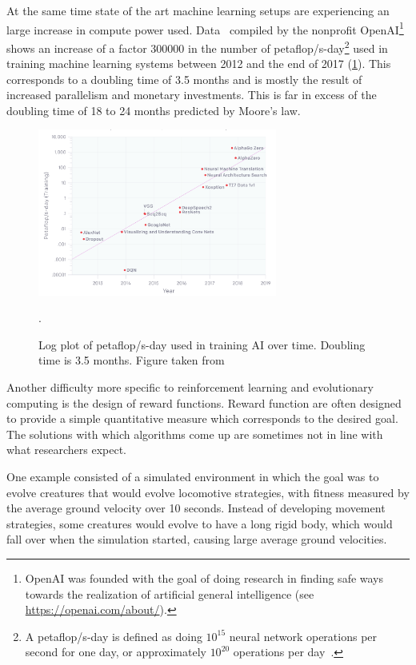 \documentclass[11pt, a4paper]{report} %
\begin{document}
At the same time state of the art machine learning setups are experiencing an large increase in compute power used.
Data~\cite{amodei2018} compiled by the nonprofit OpenAI\footnote{OpenAI was founded with the goal of doing research in finding safe ways towards the realization of artificial general intelligence (see \href{https://openai.com/about/}{https://openai.com/about/}).} shows an increase of a factor 300000 in the number of petaflop/s-day\footnote{A petaflop/s-day is defined as doing $10^{15}$ neural network operations per second for one day, or approximately $10^{20}$ operations per day~\cite{amodei2018}.} used in training machine learning systems between 2012 and the end of 2017 (\cref{fig:increasedaiflops}). 
This corresponds to a doubling time of 3.5 months and is mostly the result of increased parallelism and monetary investments.
This is far in excess of the doubling time of 18 to 24 months predicted by Moore's law.

\begin{figure}[tb!]
  \centering
  \includegraphics[width=0.7\textwidth]{increaseaiflops.png}
  \caption{Log plot of petaflop/s-day used in training AI over time. Doubling time is 3.5 months. Figure taken from~\cite{amodei2018}}.
  \label{fig:increasedaiflops}
\end{figure}

Another difficulty more specific to reinforcement learning and evolutionary computing is the design of reward functions.
Reward function are often designed to provide a simple quantitative measure which corresponds to the desired goal.
The solutions with which algorithms come up are sometimes not in line with what researchers expect.

One example consisted of a simulated environment in which the goal was to evolve creatures that would evolve locomotive strategies, with fitness measured by the average ground velocity over 10 seconds.
Instead of developing movement strategies, some creatures would evolve to have a long rigid body, which would fall over when the simulation started, causing large average ground velocities.
\end{document}
